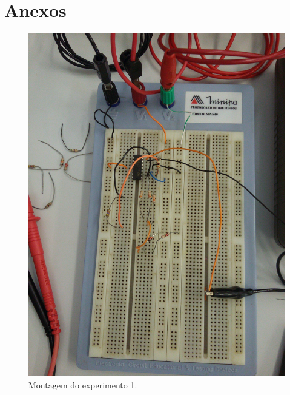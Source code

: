 \newpage
\section{Anexos}

\begin{figure}[H]
\begin{center}
\includegraphics[scale=.1]{Imagens/exp1.jpg}
\caption{Montagem do experimento 1.}
\label{exp1}
\end{center}
\end{figure}


